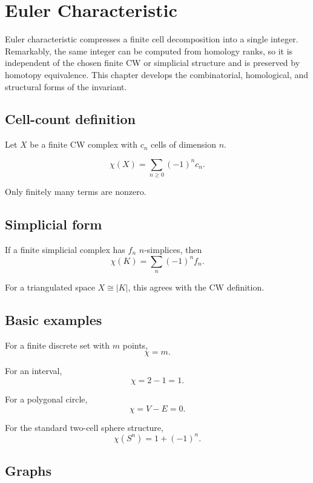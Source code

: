 ﻿\chapter{Euler Characteristic}
\label{ch:viii21-euler-characteristic}

Euler characteristic compresses a finite cell decomposition into a single
integer.  Remarkably, the same integer can be computed from homology ranks, so
it is independent of the chosen finite CW or simplicial structure and is
preserved by homotopy equivalence.  This chapter develops the combinatorial,
homological, and structural forms of the invariant.

\section{Cell-count definition}

Let \(X\) be a finite CW complex with \(c_n\) cells of dimension \(n\).

\begin{definition}
\label{def:viii21-euler}
\[
\chi(X)=\sum_{n\ge0}(-1)^n c_n.
\]
\end{definition}

Only finitely many terms are nonzero.

\section{Simplicial form}

If a finite simplicial complex has \(f_n\) \(n\)-simplices, then
\[
\chi(K)=\sum_n(-1)^n f_n.
\]

For a triangulated space \(X\cong|K|\), this agrees with the CW definition.

\section{Basic examples}

For a finite discrete set with \(m\) points,
\[
\chi=m.
\]

For an interval,
\[
\chi=2-1=1.
\]

For a polygonal circle,
\[
\chi=V-E=0.
\]

For the standard two-cell sphere structure,
\[
\chi(S^n)=1+(-1)^n.
\]

\section{Graphs}

